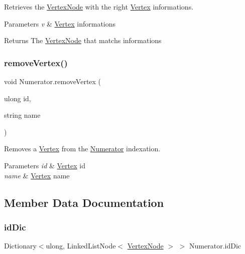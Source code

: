 Retrieves the \hyperlink{classVertexNode}{Vertex\+Node} with the right \hyperlink{structVertex}{Vertex} informations. 


\begin{DoxyParams}{Parameters}
{\em v} & \hyperlink{structVertex}{Vertex} informations\\
\hline
\end{DoxyParams}
\begin{DoxyReturn}{Returns}
The \hyperlink{classVertexNode}{Vertex\+Node} that matchs informations
\end{DoxyReturn}
\mbox{\label{classNumerator_a76233f0c954ed3987b4c1877c2555a15}} 
\subsubsection{\texorpdfstring{remove\+Vertex()}{removeVertex()}}
{\footnotesize\ttfamily void Numerator.\+remove\+Vertex (\begin{DoxyParamCaption}\item[{ulong}]{id,  }\item[{string}]{name }\end{DoxyParamCaption})\hspace{0.3cm}{\ttfamily [inline]}}



Removes a \hyperlink{structVertex}{Vertex} from the \hyperlink{classNumerator}{Numerator} indexation. 


\begin{DoxyParams}{Parameters}
{\em id} & \hyperlink{structVertex}{Vertex} id\\
\hline
{\em name} & \hyperlink{structVertex}{Vertex} name\\
\hline
\end{DoxyParams}


\subsection{Member Data Documentation}
\mbox{\label{classNumerator_a3f24879acaa114066b86c6093bfe57d6}} 
\subsubsection{\texorpdfstring{id\+Dic}{idDic}}
{\footnotesize\ttfamily Dictionary$<$ulong, Linked\+List\+Node$<$ \hyperlink{classVertexNode}{Vertex\+Node} $>$ $>$ Numerator.\+id\+Dic}



